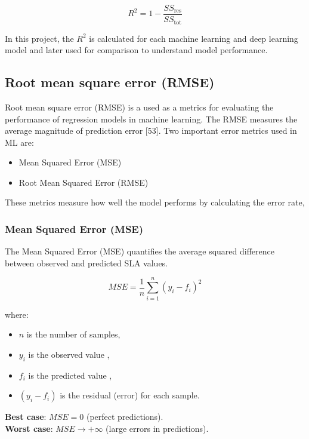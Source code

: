 \documentclass[12pt,a4paper]{report}
\begin{document}
\begin{equation}
   R^2 = 1 - \frac{SS_{\text{res}}}{SS_{\text{tot}}} 
\end{equation}


In this project, the $R^2$ is calculated for each machine learning and deep learning model and later used for comparison to understand model performance.

\subsection*{Root mean square error (RMSE)}
Root mean square error (RMSE) is a used as a metrics for evaluating the performance of regression models in machine learning. The RMSE measures the average magnitude of prediction error [53]. Two important error metrics used in ML are: \\

\begin{itemize}
    \item {Mean Squared Error (MSE)}
    \item {Root Mean Squared Error (RMSE)}
\end{itemize}

These metrics measure how well the model performs by calculating the error rate,

\subsubsection*{Mean Squared Error (MSE)}
The Mean Squared Error (MSE) quantifies the average squared difference between observed and predicted SLA values.

\begin{equation}
    MSE = \frac{1}{n} \sum_{i=1}^{n} (y_i - f_i)^2
\end{equation}

where:
\begin{itemize}
    \item $n$ is the number of samples,
    \item $y_i$ is the observed value ,
    \item $f_i$ is the predicted  value ,
    \item $(y_i - f_i)$ is the residual (error) for each sample.
\end{itemize}

\textbf{Best case}: $MSE = 0$ (perfect predictions). \\
\textbf{Worst case}: $MSE \to +\infty$ (large errors in predictions). 
\end{document}
